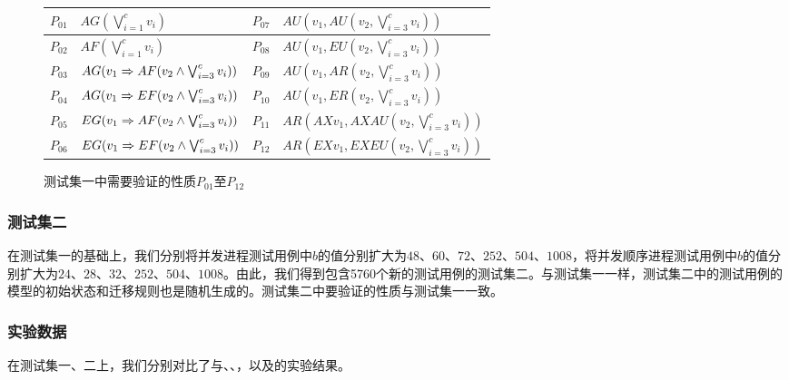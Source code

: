 \begin{figure}[!h]
	\centering
	{
		\begin{tabular}{|l|l||l|l|}
			\hline
			$P_{01}$& $AG(\bigvee^c_{i=1}v_i)$ & $P_{07}$& $AU(v_1, AU(v_2, \bigvee^c_{i=3}v_i))$\\
			\hline
			$P_{02}$& $AF(\bigvee^c_{i=1}v_i)$ & $P_{08}$ & $AU(v_1, EU(v_2, \bigvee^c_{i=3}v_i))$\\
			\hline
			$P_{03}$& $AG(v_1 \Rightarrow AF(v_2\wedge \bigvee^c_{i=3}v_i))$ & $P_{09}$& $AU(v_1, AR(v_2, \bigvee^c_{i=3}v_i))$\\
			
			\hline
			$P_{04}$& $AG(v_1 \Rightarrow EF(v_2\wedge \bigvee^c_{i=3}v_i))$ & $P_{10}$& $AU(v_1, ER(v_2, \bigvee^c_{i=3}v_i))$\\
			
			\hline
			$P_{05}$& $EG(v_1 \Rightarrow AF(v_2\wedge \bigvee^c_{i=3}v_i))$ & $P_{11}$& $AR(AX v_1, AX AU(v_2, \bigvee^c_{i=3}v_i))$\\
			
			\hline
			$P_{06}$& $EG(v_1 \Rightarrow EF(v_2\wedge \bigvee^c_{i=3}v_i))$ & $P_{12}$& $AR(EX v_1, EX EU(v_2, \bigvee^c_{i=3}v_i))$\\
			
			\hline
		\end{tabular}
	}
	\caption{测试集一中需要验证的性质$P_{01}$至$P_{12}$}
	\label{fig:properties}
\end{figure}

\subsubsection{测试集二}
在测试集一的基础上，我们分别将并发进程测试用例中$b$的值分别扩大为$48$、$60$、$72$、$252$、$504$、$1008$，将并发顺序进程测试用例中$b$的值分别扩大为$24$、$28$、$32$、$252$、$504$、$1008$。由此，我们得到包含5760个新的测试用例的测试集二。与测试集一一样，测试集二中的测试用例的模型的初始状态和迁移规则也是随机生成的。测试集二中要验证的性质与测试集一一致。


\subsubsection{实验数据}
在测试集一、二上，我们分别对比了\sctlprov{}与、\verds{}、\nusmv{}，以及\nuxmv{}的实验结果。

